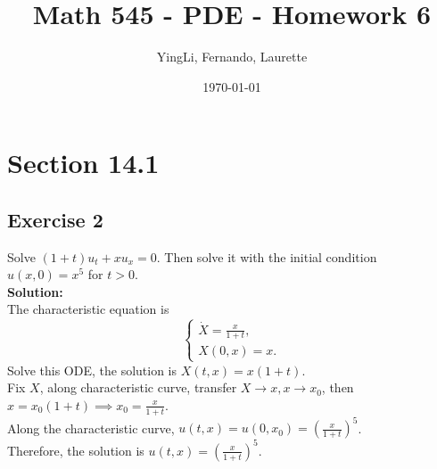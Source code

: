 \documentclass[12pt]{article}%
\begin{document}
\title{Math 545 - PDE - Homework 6}
\author{YingLi, Fernando, Laurette }
\date{\today}
\maketitle

\section*{Section 14.1}
\subsection*{Exercise 2} 
Solve $(1+t)u_{t}+xu_{x}=0$. Then solve it with the initial condition $u(x,0)=x^5$ for $t>0$.\\
\textbf{Solution:}\\
The characteristic equation is 
\begin{equation*}
    \begin{cases}
     \dot{X} =\frac{x}{1+t}, \\
      X(0,x) =x.
    \end{cases}
\end{equation*}
Solve this ODE, the solution is $X(t,x)=x(1+t)$.\\
Fix $X$, along characteristic curve, transfer $X\to x, x\to x_{0}$, then $x=x_{0}(1+t)\implies x_{0}=\frac{x}{1+t} $.\\
Along the characteristic curve, $u(t,x)=u(0,x_{0})=(\frac{x}{1+t})^5$.\\
Therefore, the solution  is $u(t,x)=(\frac{x}{1+t})^5. $
\end{document}

